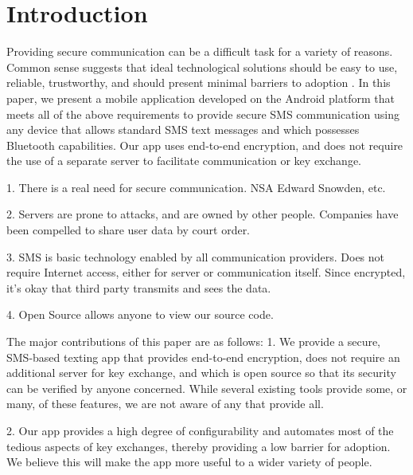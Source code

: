 \section{Introduction}
Providing secure communication can be a difficult task for a variety of reasons. Common sense
suggests that ideal technological solutions should be easy to use, reliable, trustworthy, and
should present minimal barriers to adoption . In this paper, we present a mobile application
developed on the Android platform that meets all of the above requirements to provide secure
SMS communication using any device that allows standard SMS text messages and which possesses
Bluetooth capabilities. Our app uses end-to-end encryption, and does not require the use of a
separate server to facilitate communication or key exchange.

1. There is a real need for secure communication. NSA Edward Snowden, etc.

2. Servers are prone to attacks, and are owned by other people. Companies have been compelled
to share user data by court order.

3. SMS is basic technology enabled by all communication providers. Does not require Internet
access, either for server or communication itself. Since encrypted, it's okay that third party
transmits and sees the data.

4. Open Source allows anyone to view our source code. \cite{Kerckhoffs:1883:CMF,shannon-otp}

The major contributions of this paper are as follows:
1. We provide a secure, SMS-based texting app that provides end-to-end encryption, does not require
an additional server for key exchange, and which is open source so that its security can be
verified by anyone concerned. While several existing tools provide some, or many,  of these
features, we are not aware of any that provide all.

2. Our app provides a high degree of configurability and automates most of the tedious aspects of
key exchanges, thereby providing a low barrier for adoption. We believe this will make the app more
useful to a wider variety of people.
